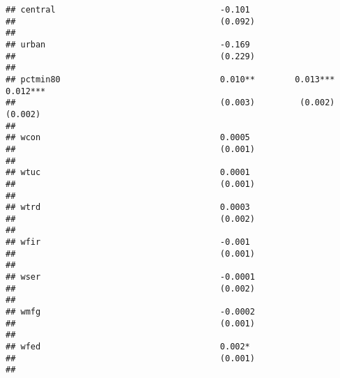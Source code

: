 \documentclass[
]{article}
\begin{document}
\begin{verbatim}
## central                                 -0.101                                     
##                                         (0.092)                                    
##                                                                                    
## urban                                   -0.169                                     
##                                         (0.229)                                    
##                                                                                    
## pctmin80                                0.010**        0.013***        0.012***    
##                                         (0.003)         (0.002)         (0.002)    
##                                                                                    
## wcon                                    0.0005                                     
##                                         (0.001)                                    
##                                                                                    
## wtuc                                    0.0001                                     
##                                         (0.001)                                    
##                                                                                    
## wtrd                                    0.0003                                     
##                                         (0.002)                                    
##                                                                                    
## wfir                                    -0.001                                     
##                                         (0.001)                                    
##                                                                                    
## wser                                    -0.0001                                    
##                                         (0.002)                                    
##                                                                                    
## wmfg                                    -0.0002                                    
##                                         (0.001)                                    
##                                                                                    
## wfed                                    0.002*                                     
##                                         (0.001)                                    
##                                                                                    

\end{verbatim}
\end{document}

